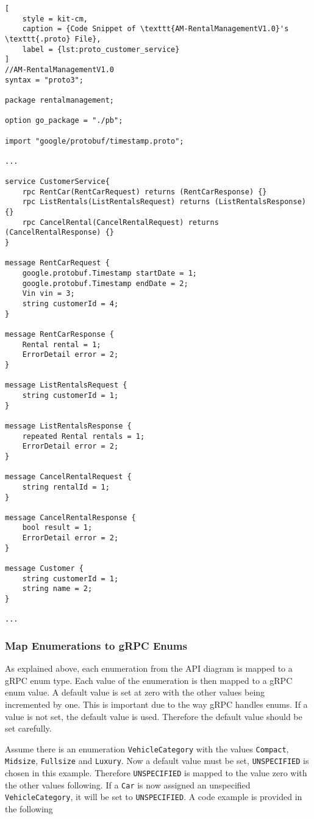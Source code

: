 \begin{lstlisting}[
    style = kit-cm,
    caption = {Code Snippet of \texttt{AM-RentalManagementV1.0}'s \texttt{.proto} File},
    label = {lst:proto_customer_service}
]
//AM-RentalManagementV1.0
syntax = "proto3";

package rentalmanagement;

option go_package = "./pb";

import "google/protobuf/timestamp.proto";

...

service CustomerService{
    rpc RentCar(RentCarRequest) returns (RentCarResponse) {}
    rpc ListRentals(ListRentalsRequest) returns (ListRentalsResponse) {}
    rpc CancelRental(CancelRentalRequest) returns (CancelRentalResponse) {}
}

message RentCarRequest {
    google.protobuf.Timestamp startDate = 1;
    google.protobuf.Timestamp endDate = 2;
    Vin vin = 3;
    string customerId = 4;
}

message RentCarResponse {
    Rental rental = 1;
    ErrorDetail error = 2;
}

message ListRentalsRequest {
    string customerId = 1;
}

message ListRentalsResponse {
    repeated Rental rentals = 1;
    ErrorDetail error = 2;
}

message CancelRentalRequest {
    string rentalId = 1;
}

message CancelRentalResponse {
    bool result = 1;
    ErrorDetail error = 2;
}

message Customer {
    string customerId = 1;
    string name = 2;
}

...
\end{lstlisting}
\subsubsection*{Map Enumerations to gRPC Enums}
As explained above, each enumeration from the API diagram is mapped to a gRPC enum type.
Each value of the enumeration is then mapped to a gRPC enum value.
A default value is set at zero with the other values being incremented by one.
This is important due to the way gRPC handles enums.
If a value is not set, the default value is used.
Therefore the default value should be set carefully.

Assume there is an enumeration \texttt{VehicleCategory} with the values \texttt{Compact}, \texttt{Midsize}, \texttt{Fullsize} and \texttt{Luxury}.
Now a default value must be set, \texttt{UNSPECIFIED} is chosen in this example.
Therefore \texttt{UNSPECIFIED} is mapped to the value zero with the other values following.
If a \texttt{Car} is now assigned an unspecified \texttt{VehicleCategory}, it will be set to \texttt{UNSPECIFIED}.
A code example is provided in the following

